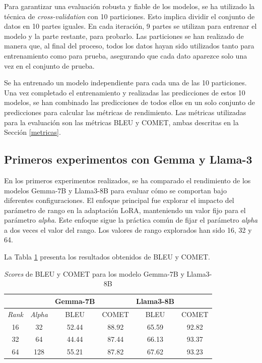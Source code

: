 \documentclass[11pt,spanish,listoffigures,listoftables]{tfgetsinf}
\begin{document}
Para garantizar una evaluación robusta y fiable de los modelos, se ha utilizado la técnica de \textit{cross-validation} con 10 particiones. Esto implica dividir el conjunto de datos en 10 partes iguales. En cada iteración, 9 partes se utilizan para entrenar el modelo y la parte restante, para probarlo. Las particiones se han realizado de manera que, al final del proceso, todos los datos hayan sido utilizados tanto para entrenamiento como para prueba, asegurando que cada dato aparezce solo una vez en el conjunto de prueba.

Se ha entrenado un modelo independiente para cada una de las 10 particiones. Una vez completado el entrenamiento y realizadas las predicciones de estos 10 modelos, se han combinado las predicciones de todos ellos en un solo conjunto de predicciones para calcular las métricas de rendimiento. Las métricas utilizadas para la evaluación son las métricas BLEU y COMET, ambas descritas en la Sección \ref{metricas}.

\subsection{Primeros experimentos con Gemma y Llama-3}

En los primeros experimentos realizados, se ha comparado el rendimiento de los modelos Gemma-7B y Llama3-8B para evaluar cómo se comportan bajo diferentes configuraciones. El enfoque principal fue explorar el impacto del parámetro de rango en la adaptación LoRA, manteniendo un valor fijo para el parámetro \textit{alpha}. Este enfoque sigue la práctica común de fijar el parámetro \textit{alpha} a dos veces el valor del rango. Los valores de rango explorados han sido 16, 32 y 64.

La Tabla \ref{tab: Gemma y Llama} presenta los resultados obtenidos de BLEU y COMET.

\begin{table}[!h]
\caption{\textit{Scores} de BLEU y COMET para los modelo Gemma-7B y Llama3-8B}
\begin{center}
\begin{tabular}{ c c c c c c }
	\ & \ & Gemma-7B & \ & Llama3-8B & \ \\
	\hline
	\textit{Rank} & \textit{Alpha} & BLEU & COMET & BLEU & COMET \\
	\hline
	\hline
	16 & 32 & 52.44 & 88.92 & 65.59 & 92.82 \\
	\hline
	32 & 64 & 44.44 & 87.44 & 66.13 & 93.37 \\
	\hline
	64 & 128 & 55.21 & 87.82 & 67.62 & 93.23 \\
	

\end{tabular}
\end{center}
\label{tab: Gemma y Llama}
\end{table}
\end{document}
